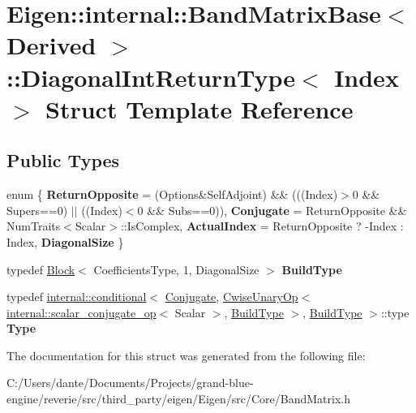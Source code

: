 \hypertarget{struct_eigen_1_1internal_1_1_band_matrix_base_1_1_diagonal_int_return_type}{}\section{Eigen\+::internal\+::Band\+Matrix\+Base$<$ Derived $>$\+::Diagonal\+Int\+Return\+Type$<$ Index $>$ Struct Template Reference}
\label{struct_eigen_1_1internal_1_1_band_matrix_base_1_1_diagonal_int_return_type}
\subsection*{Public Types}
\begin{DoxyCompactItemize}
\item 
\mbox{\label{struct_eigen_1_1internal_1_1_band_matrix_base_1_1_diagonal_int_return_type_a86645f03cc928866ae71ebb7166bf6fe}} 
enum \{ {\bfseries Return\+Opposite} = (Options\&Self\+Adjoint) \&\& (((Index)$>$0 \&\& Supers==0) $\vert$$\vert$ ((Index)$<$0 \&\& Subs==0)), 
{\bfseries Conjugate} = Return\+Opposite \&\& Num\+Traits$<$Scalar$>$\+::Is\+Complex, 
{\bfseries Actual\+Index} = Return\+Opposite ? -\/Index \+: Index, 
{\bfseries Diagonal\+Size}
 \}
\item 
\mbox{\label{struct_eigen_1_1internal_1_1_band_matrix_base_1_1_diagonal_int_return_type_af5b1872c1f56aea6549d756fa9b4b140}} 
typedef \mbox{\hyperlink{class_eigen_1_1_block}{Block}}$<$ Coefficients\+Type, 1, Diagonal\+Size $>$ {\bfseries Build\+Type}
\item 
\mbox{\label{struct_eigen_1_1internal_1_1_band_matrix_base_1_1_diagonal_int_return_type_ab71da0865441b0fdc0cfa64491dd3e00}} 
typedef \mbox{\hyperlink{struct_eigen_1_1internal_1_1conditional}{internal\+::conditional}}$<$ \mbox{\hyperlink{class_eigen_1_1_conjugate}{Conjugate}}, \mbox{\hyperlink{class_eigen_1_1_cwise_unary_op}{Cwise\+Unary\+Op}}$<$ \mbox{\hyperlink{struct_eigen_1_1internal_1_1scalar__conjugate__op}{internal\+::scalar\+\_\+conjugate\+\_\+op}}$<$ Scalar $>$, \mbox{\hyperlink{class_eigen_1_1_block}{Build\+Type}} $>$, \mbox{\hyperlink{class_eigen_1_1_block}{Build\+Type}} $>$\+::type {\bfseries Type}
\end{DoxyCompactItemize}


The documentation for this struct was generated from the following file\+:\begin{DoxyCompactItemize}
\item 
C\+:/\+Users/dante/\+Documents/\+Projects/grand-\/blue-\/engine/reverie/src/third\+\_\+party/eigen/\+Eigen/src/\+Core/Band\+Matrix.\+h\end{DoxyCompactItemize}
